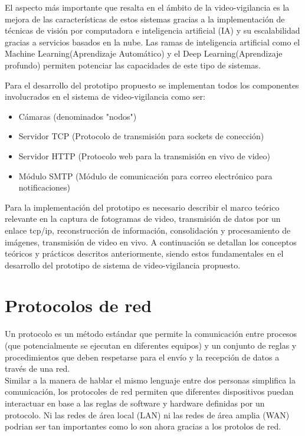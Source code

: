 El aspecto más importante que resalta en el ámbito de la video-vigilancia es la mejora de las características de estos sistemas gracias a la implementación de técnicas de visión por computadora e inteligencia artificial (IA) y su escalabilidad gracias a servicios basados en la nube. Las ramas de inteligencia artificial como el Machine Learning(Aprendizaje Automático) y el Deep Learning(Aprendizaje profundo) permiten potenciar las capacidades de este tipo de sistemas.

Para el desarrollo del prototipo propuesto se implementan todos los componentes involucrados en el sistema de video-vigilancia como ser:
\begin{itemize}
    \item Cámaras (denominados "nodos")
    \item Servidor TCP (Protocolo de transmisión para sockets de conección)
    \item Servidor HTTP (Protocolo web para la transmisión en vivo de video)
    \item Módulo SMTP (Módulo de comunicación para correo electrónico para notificaciones)
\end{itemize}

Para la implementación del prototipo es necesario describir el marco teórico relevante en la captura de fotogramas de video, transmisión de datos por un enlace tcp/ip, reconstrucción de información, consolidación y procesamiento de imágenes, transmisión de video en vivo. A continuación se detallan los conceptos teóricos y prácticos descritos anteriormente, siendo estos fundamentales en el desarrollo del prototipo de sistema de video-vigilancia propuesto.\\

\section{Protocolos de red}
Un protocolo es un método estándar que permite la comunicación entre procesos (que potencialmente se ejecutan en diferentes equipos) y un conjunto de reglas y procedimientos que deben respetarse para el envío y la recepción de datos a través de una red.\\

Similar a la manera de hablar el mismo lenguaje entre dos personas simplifica la comunicación, los protocoles de red permiten que diferentes dispositivos puedan interactuar en base a las reglas de software y hardware definidas por un protocolo. Ni las redes de área local (LAN) ni las redes de área amplia (WAN) podrian ser tan importantes como lo son ahora gracias a los protolos de red.\\

